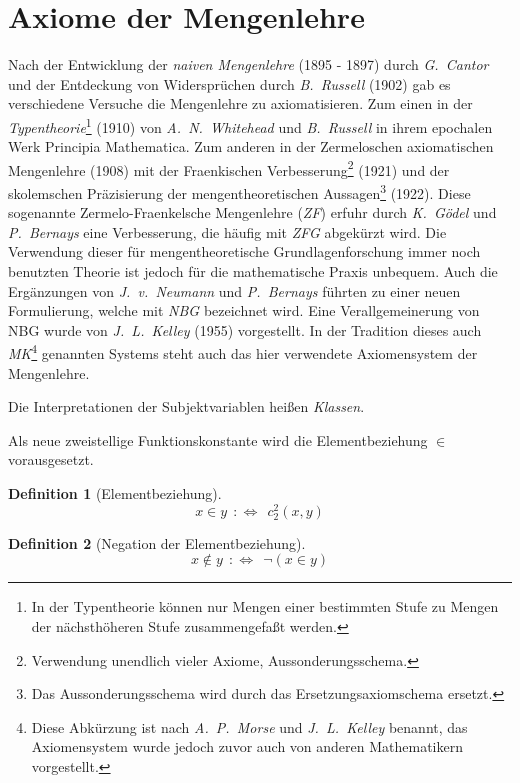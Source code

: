 \documentclass[a4paper,german,10pt,twoside]{book}
\newtheorem{defn}{Definition}
\newcommand{\defp}{\ :\Leftrightarrow \ }
\begin{document}
{\section{Axiome der Mengenlehre}
Nach der Entwicklung der \emph{naiven Mengenlehre} (1895 - 1897) durch \emph{G.~Cantor} und der
Entdeckung von Widerspr{\"u}chen durch \emph{B.~Russell} (1902) gab es verschiedene Versuche die
Mengenlehre zu axiomatisieren. Zum einen in der \emph{Typentheorie}\footnote{In der Typentheorie
k{\"o}nnen nur Mengen einer bestimmten Stufe zu Mengen der n{\"a}chsth{\"o}heren Stufe zusammengefa{\ss}t werden.}
(1910) von \emph{A.~N.~Whitehead} und \emph{B.~Russell} in ihrem epochalen Werk {\glqq Principia
Mathematica\grqq}. Zum anderen in der Zermeloschen axiomatischen Mengenlehre (1908) mit der
Fraenkischen Verbesserung\footnote{Verwendung unendlich vieler Axiome, Aussonderungsschema.} (1921)
und der skolemschen Pr{\"a}zisierung der mengentheoretischen Aussagen\footnote{Das Aussonderungsschema
wird durch das Ersetzungsaxiomschema ersetzt.} (1922). Diese sogenannte Zermelo-Fraenkelsche
Mengenlehre (\emph{ZF}) erfuhr durch \emph{K.~G{\"o}del} und \emph{P.~Bernays} eine Verbesserung, die
h{\"a}ufig mit \emph{ZFG} abgek{\"u}rzt wird. Die Verwendung dieser f{\"u}r mengentheoretische
Grundlagenforschung immer noch benutzten Theorie ist jedoch f{\"u}r die mathematische Praxis unbequem.
Auch die Erg{\"a}nzungen von \emph{J.~v.~Neumann} und \emph{P.~Bernays} f{\"u}hrten zu einer neuen
Formulierung, welche mit \emph{NBG} bezeichnet wird. Eine Verallgemeinerung von NBG
wurde von \emph{J.~L.~Kelley} (1955) vorgestellt. In der Tradition dieses auch
\emph{MK}\footnote{Diese Abk{\"u}rzung ist nach \emph{A.~P.~Morse} und \emph{J.~L.~Kelley}
benannt, das Axiomensystem wurde jedoch zuvor auch von anderen Mathematikern vorgestellt.}
genannten Systems steht auch das hier verwendete Axiomensystem der Mengenlehre.
\par

Die Interpretationen der Subjektvariablen hei{\ss}en \emph{Klassen}.

\par
Als neue zweistellige Funktionskonstante wird die Elementbeziehung $\in$ vorausgesetzt.
\begin{defn}[Elementbeziehung]
$$x \in y \ \defp \ c_2^2(x, y)$$
\end{defn}
\begin{defn}[Negation der Elementbeziehung]
$$x \not \in y \ \defp \ \neg(x \in y)$$
\end{defn}

}
\end{document}
